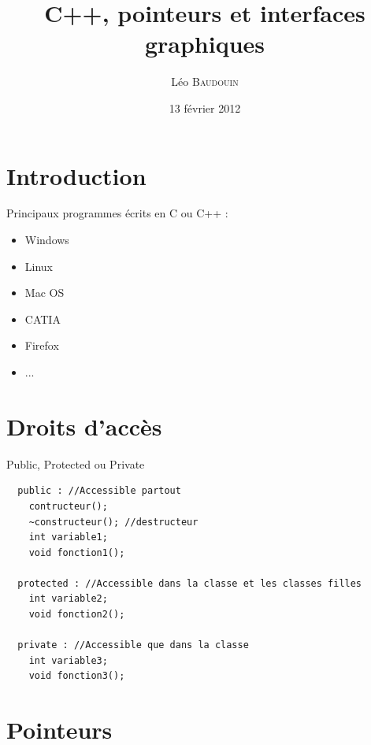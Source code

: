 \documentclass{beamer}
\title[Pr\'esentation C++]{C++, pointeurs et interfaces graphiques}
\author{L\'eo B\textsc{audouin}}
\institute[IFMA]{
  Approfondissement du C++\\
  \medskip
      {\emph{leo.baudouin@ifma.fr}}
}
\date{13 février 2012}
\begin{document}
\begin{frame}
  \titlepage
\end{frame}

\begin{frame}
  \tableofcontents
\end{frame}


\section{Introduction}
\begin{frame}
  Principaux programmes écrits en C ou C++ :
  \begin{itemize}
  \item Windows
  \item Linux
  \item Mac OS
  \item CATIA
  \item Firefox
  \item ...
  \end{itemize}
\end{frame}

\section{Droits d'accès}
\begin{frame}[fragile]{Public, Protected ou Private}

  \begin{small}
\begin{verbatim}
  public : //Accessible partout
    contructeur();
    ~constructeur(); //destructeur
    int variable1;
    void fonction1();
  
  protected : //Accessible dans la classe et les classes filles
    int variable2;
    void fonction2();
  
  private : //Accessible que dans la classe
    int variable3;
    void fonction3();
\end{verbatim}
  \end{small}
\end{frame}

\section{Pointeurs}
\end{document}
